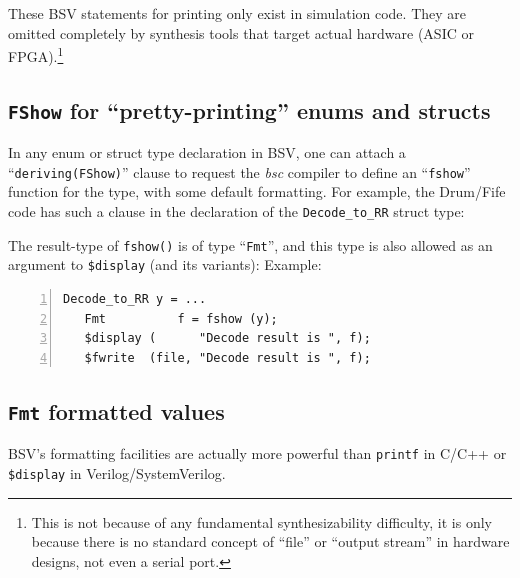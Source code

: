 These BSV statements for printing only exist in simulation code.  They
are omitted completely by synthesis tools that target actual hardware
(ASIC or FPGA).\footnote{This is not because of any fundamental
synthesizability difficulty, it is only because there is no standard
concept of ``file'' or ``output stream'' in hardware designs, not even
a serial port.}


\subsection{{\tt FShow} for ``pretty-printing'' enums and structs}


In any enum or struct type declaration in BSV, one can attach a
``\verb|deriving(FShow)|'' clause to request the \emph{bsc} compiler
to define an ``\verb|fshow|'' function for the type, with some default
formatting.  For example, the Drum/Fife code has such a clause in the
declaration of the \verb|Decode_to_RR| struct type:



The result-type of \verb|fshow()| is of type ``\verb|Fmt|'', and this
type is also allowed as an argument to \verb|$display| (and its
variants):  Example:

{\small
\begin{Verbatim}[frame=single, numbers=left]
   Decode_to_RR y = ...
   Fmt          f = fshow (y);
   $display (      "Decode result is ", f);
   $fwrite  (file, "Decode result is ", f);
\end{Verbatim}
}


\subsection{{\tt Fmt} formatted values}


BSV's formatting facilities are actually more powerful than
\verb|printf| in C/C++ or \verb|$display| in Verilog/SystemVerilog.

